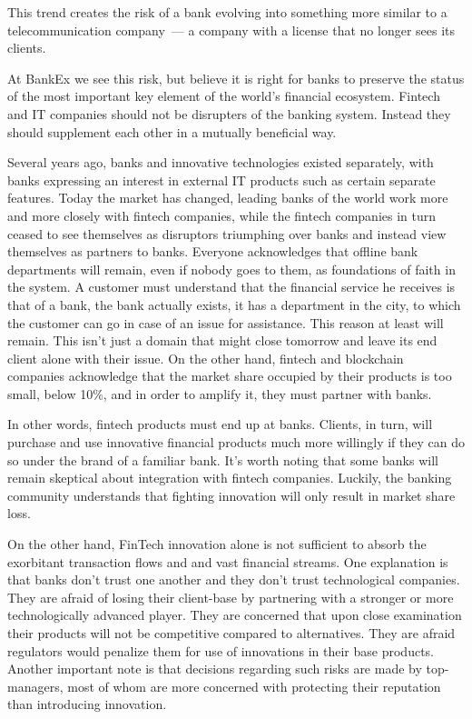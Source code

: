 \documentclass{article}
\begin{document}
\begin{multicols}{2}
This trend creates the risk of a bank evolving into something more similar to a telecommunication company~--- a company with a license that no longer sees its clients.

At BankEx we see this risk, but believe it is right for banks to preserve the status of the most important key element of the world’s financial ecosystem. Fintech and IT companies should not be disrupters of the banking system. Instead they should supplement each other in a mutually beneficial way.

Several years ago, banks and innovative technologies existed separately, with banks expressing an interest in external IT products such as certain separate features. Today the market has changed, leading banks of the world work more and more closely with fintech companies, while the fintech companies in turn ceased to see themselves as disruptors triumphing over banks and instead view themselves as partners to banks. Everyone acknowledges that offline bank departments will remain, even if nobody goes to them, as foundations of faith in the system. A customer must understand that the financial service he receives is that of a bank, the bank actually exists, it has a department in the city, to which the customer can go in case of an issue for assistance. This reason at least will remain. This isn’t just a domain that might close tomorrow and leave its end client alone with their issue. On the other hand, fintech and blockchain companies acknowledge that the market share occupied by their products is too small, below 10\%, and in order to amplify it, they must partner with banks.

In other words, fintech products must end up at banks. Clients, in turn, will purchase and use innovative financial products much more willingly if they can do so under the brand of a familiar bank. It’s worth noting that some banks will remain skeptical about integration with fintech companies. Luckily, the banking community understands that fighting innovation will only result in market share loss.

On the other hand, FinTech innovation alone is not sufficient to absorb the exorbitant transaction flows and and vast financial streams. One explanation is that banks don’t trust one another and they don’t trust technological companies. They are afraid of losing their client-base by partnering with a stronger or more technologically advanced player. They are concerned that upon close examination their products will not be competitive compared to alternatives. They are afraid regulators would penalize them for use of innovations in their base products. Another important note is that decisions regarding such risks are made by top-managers, most of whom are more concerned with protecting their reputation than introducing innovation.


\end{multicols}
\end{document}
